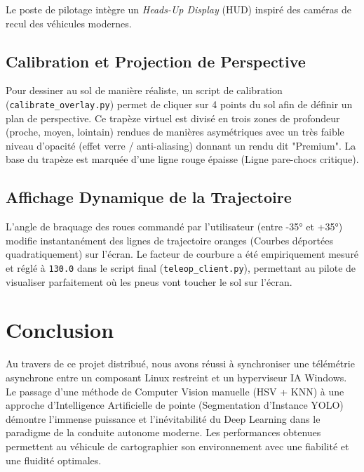 \documentclass[12pt,a4paper]{article}
\begin{document}
Le poste de pilotage intègre un \textit{Heads-Up Display} (HUD) inspiré des caméras de recul des véhicules modernes.

\subsection{Calibration et Projection de Perspective}
Pour dessiner au sol de manière réaliste, un script de calibration (\texttt{calibrate\_overlay.py}) permet de cliquer sur 4 points du sol afin de définir un plan de perspective. 
Ce trapèze virtuel est divisé en trois zones de profondeur (proche, moyen, lointain) rendues de manières asymétriques avec un très faible niveau d'opacité (effet verre / anti-aliasing) donnant un rendu dit "Premium". La base du trapèze est marquée d'une ligne rouge épaisse (Ligne pare-chocs critique).

\subsection{Affichage Dynamique de la Trajectoire}
L'angle de braquage des roues commandé par l'utilisateur (entre -35° et +35°) modifie instantanément des lignes de trajectoire oranges (Courbes déportées quadratiquement) sur l’écran. 
Le facteur de courbure a été empiriquement mesuré et réglé à \texttt{130.0} dans le script final (\texttt{teleop\_client.py}), permettant au pilote de visualiser parfaitement où les pneus vont toucher le sol sur l'écran.


\section{Conclusion}
Au travers de ce projet distribué, nous avons réussi à synchroniser une télémétrie asynchrone entre un composant Linux restreint et un hyperviseur IA Windows. 
Le passage d'une méthode de Computer Vision manuelle (HSV + KNN) à une approche d'Intelligence Artificielle de pointe (Segmentation d'Instance YOLO) démontre l'immense puissance et l'inévitabilité du Deep Learning dans le paradigme de la conduite autonome moderne. Les performances obtenues permettent au véhicule de cartographier son environnement avec une fiabilité et une fluidité optimales.
\end{document}
